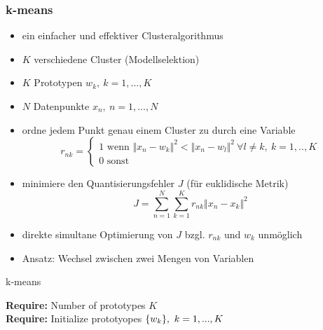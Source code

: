 	\subsubsection{k-means}
	\begin{itemize}
		\item ein einfacher und effektiver Clusteralgorithmus
		\item $K$ verschiedene Cluster (Modellselektion)
		\item $K$ Prototypen $w_k,~k=1,..., K$
		\item $N$ Datenpunkte $x_n,~n=1,..., N$
		\item ordne jedem Punkt genau einem Cluster zu durch eine Variable
		\begin{equation*}
			r_{nk} = \begin{cases}
				1 \text{ wenn } \Vert x_n-w_k\Vert^2 < \Vert x_n-w_l\Vert^2 ~\forall l\neq k,~ k=1,.., K\\
				0 \text{ sonst}
			\end{cases}
		\end{equation*}
		\item minimiere den Quantisierungsfehler $J$ (für euklidische Metrik)
		\begin{equation*}
			J = \sum_{n=1}^N\sum_{k=1}^K r_{nk}\Vert x_n-x_k\Vert^2
		\end{equation*}
		\item direkte simultane Optimierung von $J$ bzgl. $r_{nk}$ und $w_k$ unmöglich
		\item Ansatz: Wechsel zwischen zwei Mengen von Variablen
	\end{itemize}
	\begin{algorithm}
		\caption{k-means}\label{euclid}
		\begin{flushleft}
			\textbf{Require:} Number of prototypes $K$\\
			\textbf{Require:} Initialize prototyopes $\{w_k\},~k=1,..., K$
		\end{flushleft}
		\begin{algorithmic}[1]
			\Repeat
		\end{algorithmic}
	\end{algorithm}
\newpage
